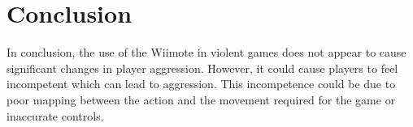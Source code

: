 \documentclass{scrartcl}
\begin{document}
\section{Conclusion}
In conclusion, the use of the Wiimote in violent games does not appear to cause significant changes in player aggression. However, it could cause players to feel incompetent which can lead to aggression. This incompetence could be due to poor mapping between the action and the movement required for the game or inaccurate controls. 
	


	
\end{document}
